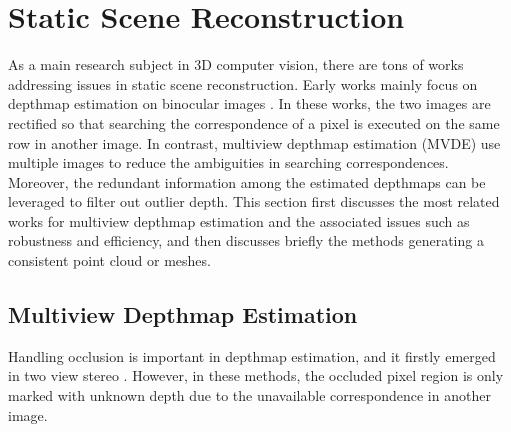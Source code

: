 
\section{Static Scene Reconstruction}
As a main research subject in 3D computer vision, there are tons of works addressing issues in static scene reconstruction. Early works mainly focus on depthmap estimation on binocular images \cite{boykov2001fast,Sun_ECCV2002_stereoBeliefProp,scharstein2002taxonomy,scharstein2007learning}. 
In these works, the two images are rectified so that searching the correspondence of a pixel is executed on the same row in another image. In contrast, multiview depthmap estimation (MVDE) use multiple images to reduce the ambiguities in searching correspondences. Moreover, the redundant information among the estimated depthmaps can be leveraged to filter out outlier depth. %
This section first discusses the most related works for multiview depthmap estimation and the associated issues such as  robustness and efficiency, and then discusses briefly the methods generating a consistent point cloud or meshes.

\subsection{Multiview Depthmap Estimation}
Handling occlusion is important in depthmap estimation, and it firstly emerged in two view stereo \cite{Sun_ECCV2002_stereoBeliefProp, Sun_CVPR2005_stereo, Xiao:2008}. However, in these methods, the occluded pixel region is only marked with unknown depth due to the unavailable correspondence in another image. 

